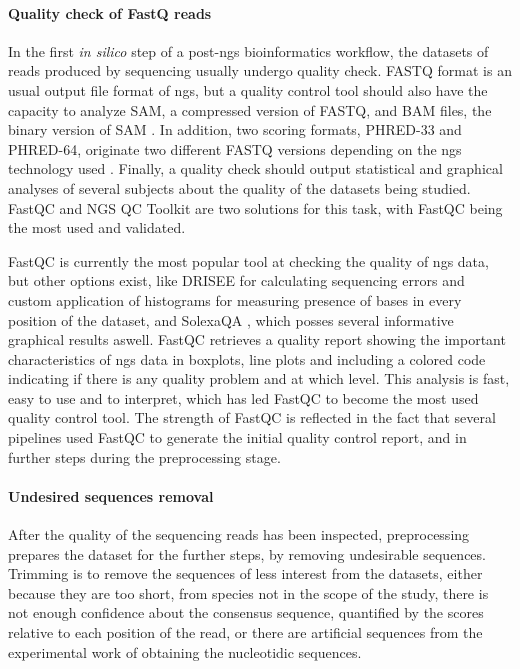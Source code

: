 \documentclass[
  oneside,
  11pt, a4paper,
  footinclude=true,
  headinclude=true,
  cleardoublepage=empty
]{scrbook}
\begin{document}
    \paragraph{Quality check of FastQ reads}
    
    In the first \textit{in silico} step of a post-\gls{ngs} bioinformatics workflow, the datasets of reads produced by sequencing usually undergo quality check. FASTQ format is an usual output file format of \gls{ngs}, but a quality control tool should also have the capacity to analyze SAM, a compressed version of FASTQ, and BAM files, the binary version of SAM \citep{jones2012compression}. In addition, two scoring formats, PHRED-33 and PHRED-64, originate two different FASTQ versions depending on the \gls{ngs} technology used \citep{cock2010sanger}. Finally, a quality check should output statistical and graphical analyses of several subjects about the quality of the datasets being studied. FastQC \citep{andrews2010fastqc} and NGS QC Toolkit \citep{10.1371/journal.pone.0030619} are two solutions for this task, with FastQC being the most used and validated.
    
    FastQC \citep{andrews2010fastqc} is currently the most popular tool at checking the quality of \gls{ngs} data, but other options exist, like DRISEE for calculating sequencing errors and custom application of histograms for measuring presence of bases in every position of the dataset, and SolexaQA \citep{cox2010solexaqa}, which posses several informative graphical results aswell. FastQC retrieves a quality report showing the important characteristics of \gls{ngs} data in boxplots, line plots and including a colored code indicating if there is any quality problem and at which level. This analysis is fast, easy to use and to interpret, which has led FastQC to become the most used quality control tool. The strength of FastQC is reflected in the fact that several pipelines used FastQC to generate the initial quality control report, and in further steps during the preprocessing stage. 
    
    \paragraph{Undesired sequences removal}
    
    After the quality of the sequencing reads has been inspected, preprocessing prepares the dataset for the further steps, by removing undesirable sequences. Trimming is to remove the sequences of less interest from the datasets, either because they are too short, from species not in the scope of the study, there is not enough confidence about the consensus sequence, quantified by the scores relative to each position of the read, or there are artificial sequences from the experimental work of obtaining the nucleotidic sequences.
    
\end{document}

